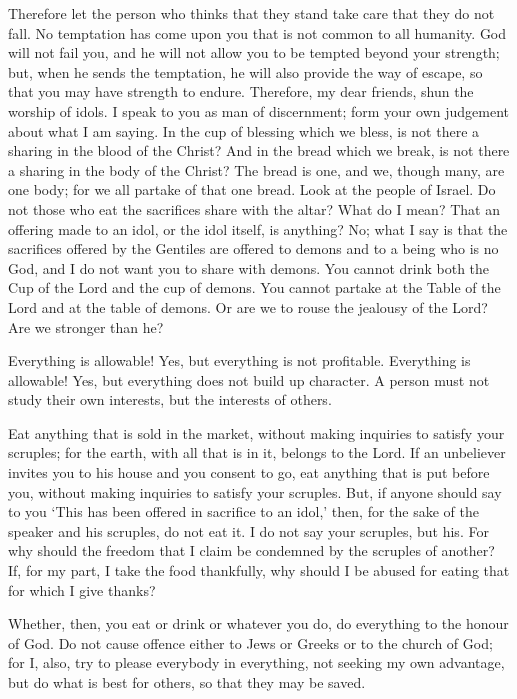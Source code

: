  Therefore let the person who thinks that they stand take
care that they do not fall.  No temptation has come upon
you that is not common to all humanity. God will not fail you, and he
will not allow you to be tempted beyond your strength; but, when he
sends the temptation, he will also provide the way of escape, so that
you may have strength to endure.  Therefore, my dear
friends, shun the worship of idols.  I speak to you as man
of discernment; form your own judgement about what I am saying.
 In the cup of blessing which we bless, is not there a
sharing in the blood of the Christ? And in the bread which we break, is
not there a sharing in the body of the Christ?  The bread
is one, and we, though many, are one body; for we all partake of that
one bread.  Look at the people of Israel. Do not those who
eat the sacrifices share with the altar?  What do I mean?
That an offering made to an idol, or the idol itself, is anything?
 No; what I say is that the sacrifices offered by the
Gentiles are offered to demons and to a being who is no God, and I do
not want you to share with demons.  You cannot drink both
the Cup of the Lord and the cup of demons. You cannot partake at the
Table of the Lord and at the table of demons.  Or are we to
rouse the jealousy of the Lord? Are we stronger than he?

 Everything is allowable! Yes, but everything is not
profitable. Everything is allowable! Yes, but everything does not build
up character.  A person must not study their own interests,
but the interests of others.

 Eat anything that is sold in the market, without making
inquiries to satisfy your scruples;  for the earth, with
all that is in it, belongs to the Lord.  If an unbeliever
invites you to his house and you consent to go, eat anything that is put
before you, without making inquiries to satisfy your scruples.
 But, if anyone should say to you `This has been offered in
sacrifice to an idol,' then, for the sake of the speaker and his
scruples, do not eat it.  I do not say your scruples, but
his. For why should the freedom that I claim be condemned by the
scruples of another?  If, for my part, I take the food
thankfully, why should I be abused for eating that for which I give
thanks?

 Whether, then, you eat or drink or whatever you do, do
everything to the honour of God.  Do not cause offence
either to Jews or Greeks or to the church of God;  for I,
also, try to please everybody in everything, not seeking my own
advantage, but do what is best for others, so that they may be saved.

